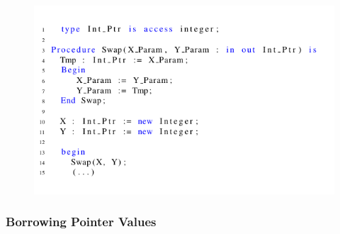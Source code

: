 \documentclass{llncs}
\begin{document}
\begin{figure}[htb!]
\centering
   \includegraphics[width=\columnwidth]{move_ex1}
   \caption{}
   \label{fig:move_ex1}
\end{figure}
 

\subsubsection{Borrowing Pointer Values}
\label{sec:borrowing}
\end{document}
